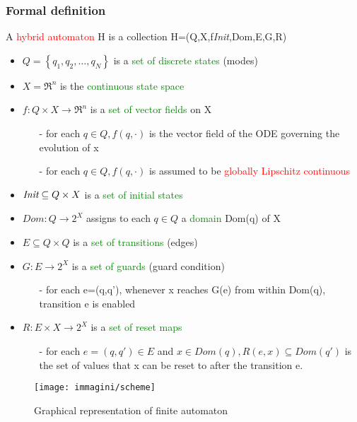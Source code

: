 \subsubsection{Formal definition}
A \textcolor{red}{hybrid automaton} H is a collection H=(Q,X,f\textit{Init},Dom,E,G,R)
\begin{itemize}
	\item $Q = \left\{q_1,q_2, \dots,q_N\right\}$ is a \textcolor{green}{set of discrete states} (modes)
	\item $X=\Re^n$ is the \textcolor{green}{continuous state space}
	\item $f\colon Q\times X\to\Re^n$ is a \textcolor{green}{set of vector fields} on X
	\begin{itemize}
		\item[-] for each $q\in Q,f(q,\cdot)$ is the vector field of the ODE governing the evolution of x
		\item[-] for each $q\in Q,f(q,\cdot)$ is assumed to be \textcolor{red}{globally Lipschitz continuous}
	\end{itemize}
	\item $\emph{Init} \subseteq Q \times X$ is a \textcolor{green}{set of initial states}
	\item $Dom \colon Q \to 2^X$ assigns to each $q\in Q$ a \textcolor{green}{domain} Dom(q) of X
	\item $E \subseteq Q \times Q$ is a \textcolor{green}{set of transitions} (edges)
	\item $G\colon E\to 2^X$ is a \textcolor{green}{set of guards} (guard condition)
	\begin{itemize}
		\item[-] for each e=(q,q'), whenever x reaches G(e) from within Dom(q), transition e is enabled
	\end{itemize}
	\item $R\colon E\times X \to 2^X$ is a \textcolor{green}{set of reset maps}
	\begin{itemize}
		\item[-] for each $e=(q,q') \in E$ and $x \in Dom(q), R(e,x)\subseteq Dom(q')$ is the set of values that x can be reset to after the transition e.
	\end{itemize}
\end{itemize}
\begin{figure}[h]
	\centering
	\texttt{[image: immagini/scheme]}
	\caption{Graphical representation of finite automaton}
	\label{fig:scheme}
\end{figure}

